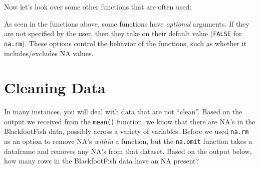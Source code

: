 \documentclass[]{article}
\newenvironment{Shaded}{\begin{snugshade}}{\end{snugshade}}
\newcommand{\KeywordTok}[1]{\textcolor[rgb]{0.13,0.29,0.53}{\textbf{#1}}}
\newcommand{\StringTok}[1]{\textcolor[rgb]{0.31,0.60,0.02}{#1}}
\newcommand{\OperatorTok}[1]{\textcolor[rgb]{0.81,0.36,0.00}{\textbf{#1}}}
\newcommand{\NormalTok}[1]{#1}
\begin{document}
Now let's look over some other functions that are often used:

\vspace{0.25cm}

\begin{Shaded}
\end{Shaded}

\vspace{0.25cm}

As seen in the functions above, some functions have \emph{optional}
arguments. If they are not specified by the user, then they take on
their default value (\texttt{FALSE} for \texttt{na.rm}). These options
control the behavior of the functions, such as whether it
includes/excludes NA values.

\section{Cleaning Data}\label{cleaning-data}

In many instances, you will deal with data that are not ``clean''. Based
on the output we received from the \texttt{mean()} function, we know
that there are NA's in the BlackfootFish data, possibly across a variety
of variables. Before we used \texttt{na.rm} as an option to remove NA's
\emph{within} a function, but the \texttt{na.omit} function takes a
dataframe and removes any NA's from that dataset. Based on the output
below, how many rows in the BlackfootFish data have an NA present?

\vspace{0.5cm}
\end{document}
